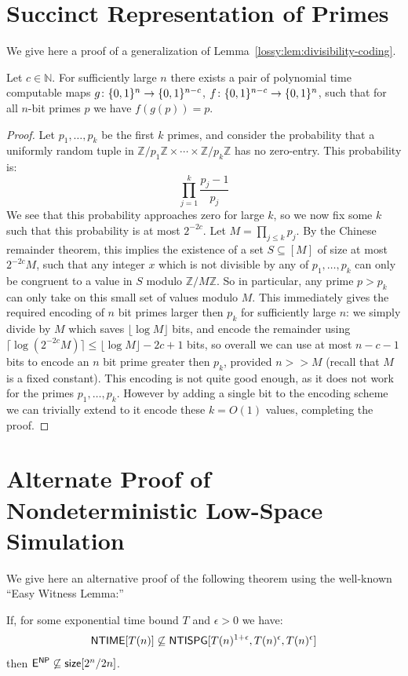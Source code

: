 \section{Succinct Representation of Primes}\label{lossy:appendix:primes}
We give here a proof of a generalization of Lemma~\ref{lossy:lem:divisibility-coding}.
\begin{lemma*}
Let $c \in \mathbb{N}$. For sufficiently large $n$ there exists a pair of polynomial time computable maps $g\colon \{0,1\}^n \rightarrow \{0,1\}^{n-c}$, $f\colon \{0,1\}^{n-c} \rightarrow \{0,1\}^n$, such that for all $n$-bit primes $p$ we have $f(g(p)) = p$.
\end{lemma*}
\begin{proof}
Let $p_1,\ldots,p_k$ be the first $k$ primes, and consider the probability that a uniformly random tuple in $\mathbb{Z}/p_1\mathbb{Z} \times \cdots \times \mathbb{Z}/p_k\mathbb{Z}$ has no zero-entry. This probability is:
\[
\prod\limits_{j=1}^k \frac{p_j-1}{p_j}
\]
We see that this probability approaches zero for large $k$, so we now fix some $k$ such that this probability is at most $2^{-2c}$. Let $M = \prod\limits_{j \leq k} p_j$. By the Chinese remainder theorem, this implies the existence of a set $S \subseteq [M]$ of size at most $2^{-2c}M$, such that any integer $x$ which is not divisible by any of $p_1,\ldots,p_k$ can only be congruent to a value in $S$ modulo $\mathbb{Z}/M\mathbb{Z}$. So in particular, any prime $p > p_k$ can only take on this small set of values modulo $M$. This immediately gives the required encoding of $n$ bit primes larger then $p_k$ for sufficiently large $n$: we simply divide by $M$ which saves $\lfloor \log M \rfloor$ bits, and encode the remainder using $\lceil \log (2^{-2c} M) \rceil \leq \lfloor \log M \rfloor - 2c + 1$ bits, so overall we can use at most $n - c - 1$ bits to encode an $n$ bit prime greater then $p_k$, provided $n >> M$ (recall that $M$ is a fixed constant). This encoding is not quite good enough, as it does not work for the primes $p_1,\ldots,p_k$. However by adding a single bit to the encoding scheme we can trivially extend to it encode these $k = O(1)$ values, completing the proof.
\end{proof}

\section{Alternate Proof of Nondeterministic Low-Space Simulation}\label{lossy:appendix:ewl}

We give here an alternative proof of the following theorem using the well-known ``Easy Witness Lemma:''
\begin{theorem*}
If, for some exponential time bound $T$ and $\epsilon > 0$ we have:
\[
\cl{NTIME}[T(n)] \not\subseteq \cl{NTISPG}[T(n)^{1+\epsilon}, T(n)^{\epsilon}, T(n)^{\epsilon}]
\]
then $\cl{E}^\cl{NP} \not\subseteq \cl{size}[2^n/2n]$.
\end{theorem*}

